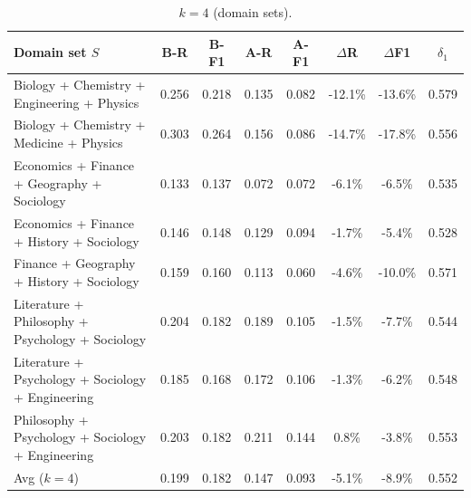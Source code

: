 \begin{table}[!ht]
\begin{subtable}[t]{\textwidth}
\caption{$k{=}4$ (domain sets).}
\centering
\begin{tabular}{lccccccc}
\toprule
Domain set $S$ &
B-R & B-F1 &
A-R & A-F1 &
$\Delta$R & $\Delta$F1 &
$\delta_1$ \\
\midrule
Biology + Chemistry + Engineering + Physics            & 0.256 & 0.218 & 0.135 & 0.082 & -12.1\% & -13.6\% & 0.579 \\
Biology + Chemistry + Medicine + Physics               & 0.303 & 0.264 & 0.156 & 0.086 & -14.7\% & -17.8\% & 0.556 \\
Economics + Finance + Geography + Sociology            & 0.133 & 0.137 & 0.072 & 0.072 & -6.1\% & -6.5\% & 0.535 \\
Economics + Finance + History + Sociology             & 0.146 & 0.148 & 0.129 & 0.094 & -1.7\% & -5.4\% & 0.528 \\
Finance + Geography + History + Sociology             & 0.159 & 0.160 & 0.113 & 0.060 & -4.6\% & -10.0\% & 0.571 \\
Literature + Philosophy + Psychology + Sociology       & 0.204 & 0.182 & 0.189 & 0.105 & -1.5\% & -7.7\% & 0.544 \\
Literature + Psychology + Sociology + Engineering      & 0.185 & 0.168 & 0.172 & 0.106 & -1.3\% & -6.2\% & 0.548 \\
Philosophy + Psychology + Sociology + Engineering      & 0.203 & 0.182 & 0.211 & 0.144 & 0.8\% & -3.8\% & 0.553 \\
\midrule
Avg ($k{=}4$) & 0.199 & 0.182 & 0.147 & 0.093 & -5.1\% & -8.9\% & 0.552 \\
\bottomrule
\end{tabular}
\end{subtable}
\end{table}


